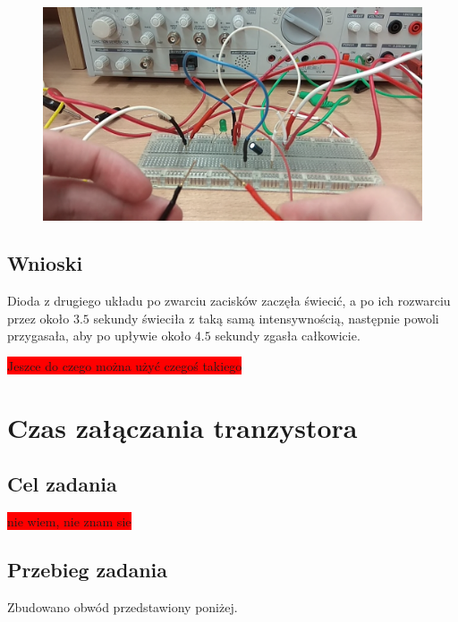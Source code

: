 \documentclass[polish,polish,a4paper]{article}
\begin{document}
\begin{figure}[H]
	\centering
	\includegraphics[scale=0.3]{4.png}
\end{figure}

\subsection{Wnioski}

Dioda z drugiego układu po zwarciu zacisków zaczęła świecić, a po ich rozwarciu przez około $ 3.5 $ sekundy świeciła z taką samą intensywnością, następnie powoli przygasała, aby po upływie około $ 4.5 $ sekundy zgasła całkowicie.

{\LARGE \colorbox{red}{Jeszce do czego można użyć czegoś takiego}}

\section{Czas załączania tranzystora}

\subsection{Cel zadania}
{\LARGE \colorbox{red}{nie wiem, nie znam sie}}

\subsection{Przebieg zadania}

Zbudowano obwód przedstawiony poniżej.
\end{document}
